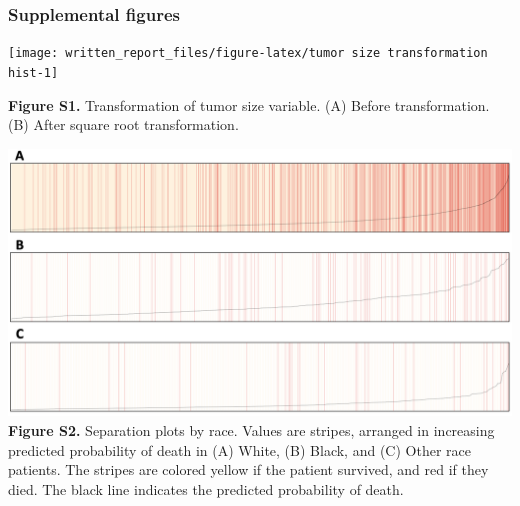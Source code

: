 \documentclass[]{article}
\begin{document}
\newpage

\hypertarget{supplemental-figures}{%
\subsubsection{Supplemental figures}\label{supplemental-figures}}

\texttt{[image: written\_report\_files/figure-latex/tumor size transformation hist-1]}

\textbf{Figure S1.} Transformation of tumor size variable. (A) Before
transformation. (B) After square root transformation.

\newpage

\includegraphics{images/sep_plot_race.png} \textbf{Figure S2.}
Separation plots by race. Values are stripes, arranged in increasing
predicted probability of death in (A) White, (B) Black, and (C) Other
race patients. The stripes are colored yellow if the patient survived,
and red if they died. The black line indicates the predicted probability
of death.
\end{document}
